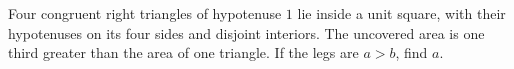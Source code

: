 Four congruent right triangles of hypotenuse $1$ lie inside a unit square, with their hypotenuses on its four sides and disjoint interiors. The uncovered area is one third greater than the area of one triangle. If the legs are $a>b$, find $a$.
